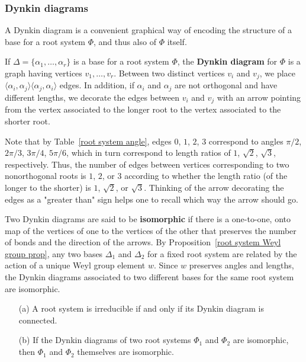 \subsubsection{Dynkin diagrams}
A Dynkin diagram is a convenient graphical way of encoding the structure of a base for a root system $\Phi$, and thus also of $\Phi$ itself.
\begin{definition}
If $\Delta=\{\alpha_1,\dots,\alpha_r\}$ is a base for a root system $\Phi$, the \textbf{Dynkin diagram} for $\Phi$ is a graph having vertices $v_1,\dots,v_r$. Between two distinct vertices $v_i$ and $v_j$, we place $\langle\alpha_i,\alpha_j\rangle\langle\alpha_j,\alpha_i\rangle$ edges. In addition, if $\alpha_i$ and $\alpha_j$ are not orthogonal and have different lengths, we decorate the edges between $v_i$ and $v_j$ with an arrow pointing from the vertex associated to the longer root to the vertex associated to the shorter root.
\end{definition}
Note that by Table~\ref{root system angle}, edges $0$, $1$, $2$, $3$ correspond to angles $\pi/2$, $2\pi/3$, $3\pi/4$, $5\pi/6$, which in turn correspond to length ratios of $1$, $\sqrt{2}$, $\sqrt{3}$, respectively. Thus, the number of edges between vertices corresponding to two nonorthogonal roots is $1$, $2$, or $3$ according to whether the length ratio (of the longer to the shorter) is $1$, $\sqrt{2}$, or $\sqrt{3}$. Thinking of the arrow decorating the edges as a "greater than" sign helps one to recall which way the arrow should go.\par
Two Dynkin diagrams are said to be \textbf{isomorphic} if there is a one-to-one, onto map of the vertices of one to the vertices of the other that preserves the number of bonds and the direction of the arrows. By Proposition~\ref{root system Weyl group prop}, any two bases $\Delta_1$ and $\Delta_2$ for a fixed root system are related by the action of a unique Weyl group element $w$. Since $w$ preserves angles and lengths, the Dynkin diagrams associated to two different bases for the same root system are isomorphic.
\begin{proposition}\label{root system determined by Dynkin diagram}
\mbox{}
\begin{itemize}
\item[(a)] A root system is irreducible if and only if its Dynkin diagram is connected.
\item[(b)] If the Dynkin diagrams of two root systems $\Phi_1$ and $\Phi_2$ are isomorphic, then $\Phi_1$ and $\Phi_2$ themselves are isomorphic.
\end{itemize}
\end{proposition}
